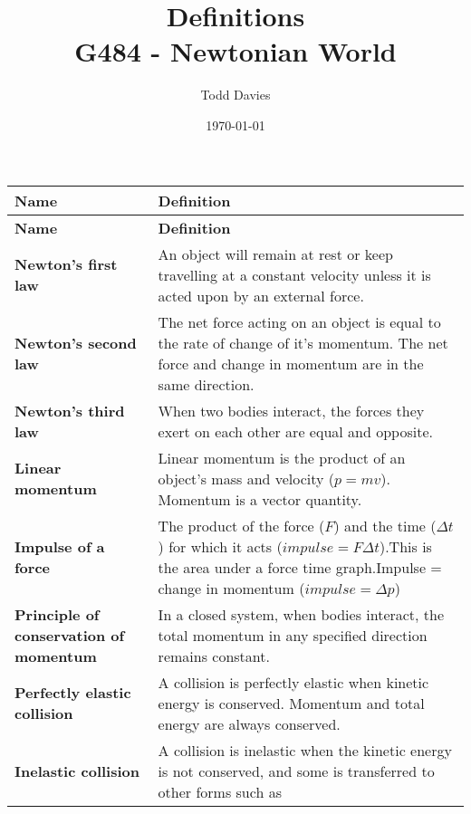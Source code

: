 \documentclass{article}
\title{Definitions \\ \large{G484 - Newtonian World}}
\author{Todd Davies}
\date{\today}
\begin{document}
\lhead{\today}

\maketitle

\thispagestyle{empty}

\begin{longtable}{>{\bf\centering\arraybackslash}p{1in} 
  p{\textwidth-4\tabcolsep-1in}}

\large{Name} & \large{\textbf{Definition}}\\ \midrule
\endfirsthead
\large{Name} & \large{\textbf{Definition}}\\ \midrule
\endhead
\midrule
\multicolumn{2}{r}{continued \ldots}
\endfoot
\endlastfoot
  Newton's first law & An object will remain at rest or keep 
    travelling at a constant velocity unless it is acted upon by an external 
    force.\\ \midrule
  Newton's second law & The net force acting on an object is equal
    to the rate of change of it's momentum. The net force and change in momentum
    are in the same direction.\\ \midrule
  Newton's third law & When two bodies interact, the forces they
    exert on each other are equal and opposite.\\ \midrule
  Linear momentum & Linear momentum is the product of an object's mass and
    velocity ($p=mv$). Momentum is a vector quantity.\\ \midrule
  Impulse of a force & The product of the force ($F$) and the time ($\Delta t$)
    for which it acts ($impulse = F \Delta t$).\newline \newline This is the
    area under a force time graph.\newline \newline Impulse = change in momentum
    ($impulse = \Delta p$)\\ \midrule
  Principle of conservation of momentum & In a closed system, when bodies
    interact, the total momentum in any specified direction remains constant.\\
    \midrule
  Perfectly elastic collision & A collision is perfectly elastic
    when kinetic energy is conserved. Momentum and total energy are always
    conserved.\\ \midrule
  Inelastic collision & A collision is inelastic when the kinetic
    energy is not conserved, and some is transferred to other forms such as

\end{longtable}
\end{document}
